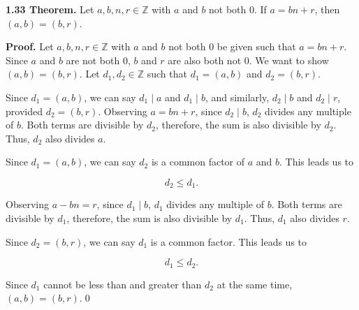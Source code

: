 \documentclass[12pt]{article}
\begin{document}
\noindent\textbf{1.33 Theorem.} Let $a,b,n,r\in\mathbb{Z}$ with $a$ and $b$ not both 0. If $a=bn+r$, then $(a,b)=(b,r)$.

\bigskip

\noindent\textbf{Proof.} Let $a,b,n,r\in\mathbb{Z}$ with $a$ and $b$ not both 0 be given such that $a=bn+r$. Since $a$ and $b$ are not both 0, $b$ and $r$ are also both not 0. We want to show $(a,b)=(b,r)$. Let $d_{1},d_{2}\in\mathbb{Z}$ such that $d_{1}=(a,b)$ and $d_{2}=(b,r)$.

\bigskip

\noindent Since $d_{1}=(a,b)$, we can say $d_{1}\mid a$ and $d_{1}\mid b$, and similarly, $d_{2}\mid b$ and $d_{2}\mid r$, provided $d_{2}=(b,r)$. Observing $a=bn+r$, since  $d_{2}\mid b$, $d_{2}$ divides any multiple of $b$. Both terms are divisible by $d_{2}$, therefore, the sum is also divisible by $d_{2}$. Thus, $d_{2}$ also divides $a$.

\bigskip

\noindent Since $d_{1}=(a,b)$, we can say $d_{2}$ is a common factor of $a$ and $b$. This leads us to

\begin{equation*}
d_{2}\leq d_{1}.
\end{equation*}

\noindent Observing $a-bn=r$, since $d_{1}\mid b$, $d_{1}$ divides any multiple of $b$. Both terms are divisible by $d_{1}$, therefore, the sum is also divisible by $d_{1}$. Thus, $d_{1}$ also divides $r$. 

\bigskip

\noindent Since $d_{2}=(b,r)$, we can say $d_{1}$ is a common factor. This leads us to

\begin{equation*}
d_{1}\leq d_{2}.
\end{equation*}

\noindent Since $d_{1}$ cannot be less than and greater than $d_{2}$ at the same time, $(a,b)=(b,r).$\qed
\end{document}
